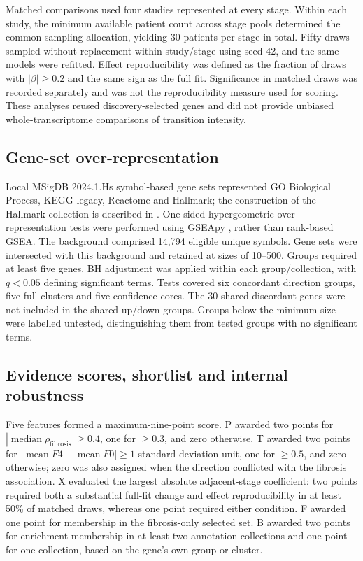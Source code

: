 \documentclass[11pt,a4paper]{article}
\begin{document}
Matched comparisons used four studies represented at every stage. Within each study, the minimum available patient count across stage pools determined the common sampling allocation, yielding 30 patients per stage in total. Fifty draws sampled without replacement within study/stage using seed 42, and the same models were refitted. Effect reproducibility was defined as the fraction of draws with \(|\beta|\geq0.2\) and the same sign as the full fit. Significance in matched draws was recorded separately and was not the reproducibility measure used for scoring. These analyses reused discovery-selected genes and did not provide unbiased whole-transcriptome comparisons of transition intensity.

\subsection*{Gene-set over-representation}
Local MSigDB 2024.1.Hs symbol-based gene sets represented GO Biological Process, KEGG legacy, Reactome and Hallmark; the construction of the Hallmark collection is described in \cite{ref12}. One-sided hypergeometric over-representation tests were performed using GSEApy \cite{ref13}, rather than rank-based GSEA. The background comprised 14,794 eligible unique symbols. Gene sets were intersected with this background and retained at sizes of 10–500. Groups required at least five genes. BH adjustment was applied within each group/collection, with \(q<0.05\) defining significant terms. Tests covered six concordant direction groups, five full clusters and five confidence cores. The 30 shared discordant genes were not included in the shared-up/down groups. Groups below the minimum size were labelled untested, distinguishing them from tested groups with no significant terms.

\subsection*{Evidence scores, shortlist and internal robustness}
Five features formed a maximum-nine-point score. P awarded two points for \(|\operatorname{median}\rho_{\mathrm{fibrosis}}|\geq0.4\), one for \(\geq 0.3\), and zero otherwise. T awarded two points for \(|\operatorname{mean}F4-\operatorname{mean}F0|\geq1\) standard-deviation unit, one for \(\geq 0.5\), and zero otherwise; zero was also assigned when the direction conflicted with the fibrosis association. X evaluated the largest absolute adjacent-stage coefficient: two points required both a substantial full-fit change and effect reproducibility in at least 50\% of matched draws, whereas one point required either condition. F awarded one point for membership in the fibrosis-only selected set. B awarded two points for enrichment membership in at least two annotation collections and one point for one collection, based on the gene's own group or cluster.
\end{document}
